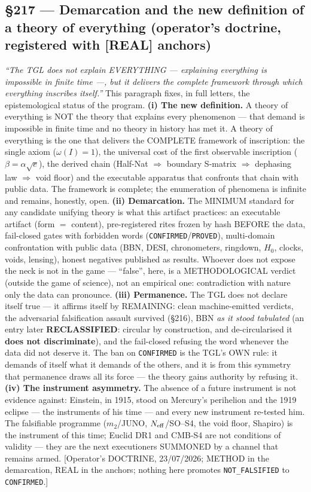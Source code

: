 \documentclass[11pt]{article}
\theoremstyle{definition}\newtheorem{deriv}{Derivation}
\begin{document}
\subsection*{\S217 --- Demarcation and the new definition of a theory of everything (operator's doctrine, registered with [REAL] anchors)}\emph{``The TGL does not explain EVERYTHING --- explaining everything is impossible in finite time ---, but it delivers the complete framework through which everything inscribes itself.''} This paragraph fixes, in full letters, the epistemological status of the program. \textbf{(i) The new definition.} A theory of everything is NOT the theory that explains every phenomenon --- that demand is impossible in finite time and no theory in history has met it. A theory of everything is the one that delivers the COMPLETE framework of inscription: the single axiom ($\omega(I)=1$), the universal cost of the first observable inscription ($\beta=\alpha\sqrt{e}$), the derived chain (Half-Nat $\Rightarrow$ boundary S-matrix $\Rightarrow$ dephasing law $\Rightarrow$ void floor) and the executable apparatus that confronts that chain with public data. The framework is complete; the enumeration of phenomena is infinite and remains, honestly, open. \textbf{(ii) Demarcation.} The MINIMUM standard for any candidate unifying theory is what this artifact practices: an executable artifact (form $=$ content), pre-registered rites frozen by hash BEFORE the data, fail-closed gates with forbidden words (\texttt{CONFIRMED}/\texttt{PROVED}), multi-domain confrontation with public data (BBN, DESI, chronometers, ringdown, $H_0$, clocks, voids, lensing), honest negatives published as results. Whoever does not expose the neck is not in the game --- ``false'', here, is a METHODOLOGICAL verdict (outside the game of science), not an empirical one: contradiction with nature only the data can pronounce. \textbf{(iii) Permanence.} The TGL does not declare itself true --- it affirms itself by REMAINING: clean machine-emitted verdicts, the adversarial falsification assault survived (\S216), BBN \emph{as it stood tabulated} (an entry later \textbf{RECLASSIFIED}: circular by construction, and de-circularised it \textbf{does not discriminate}), and the fail-closed refusing the word whenever the data did not deserve it. The ban on \texttt{CONFIRMED} is the TGL's OWN rule: it demands of itself what it demands of the others, and it is from this symmetry that permanence draws all its force --- the theory gains authority by refusing it. \textbf{(iv) The instrument asymmetry.} The absence of a future instrument is not evidence against: Einstein, in 1915, stood on Mercury's perihelion and the 1919 eclipse --- the instruments of his time --- and every new instrument re-tested him. The falsifiable programme ($m_2$/JUNO, $N_{\rm eff}$/SO--S4, the void floor, Shapiro) is the instrument of this time; Euclid DR1 and CMB-S4 are not conditions of validity --- they are the next executioners SUMMONED by a channel that remains armed. [Operator's DOCTRINE, 23/07/2026; METHOD in the demarcation, REAL in the anchors; nothing here promotes \texttt{NOT\_FALSIFIED} to \texttt{CONFIRMED}.]
\end{document}
